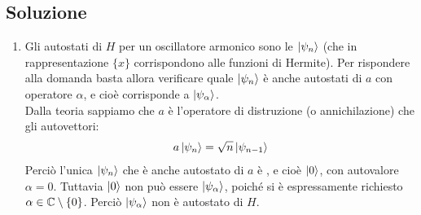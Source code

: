 \documentclass[../../FisicaTeorica.tex]{subfiles}
\begin{document}
\subsection{Soluzione}
\begin{enumerate}
\item Gli autostati di $H$ per un oscillatore armonico sono le $\Ket{\psi_n}$ (che in rappresentazione $\{x\}$ corrispondono alle funzioni di Hermite). Per rispondere alla domanda basta allora verificare quale $\Ket{\psi_n}$ è anche autostati di $a$ con operatore $\alpha$, e cioè corrisponde a $\Ket{\psi_\alpha}$.\\
Dalla teoria sappiamo che $a$ è l'operatore di distruzione (o annichilazione) che  gli autovettori:
\begin{align*}
a\Ket{\psi_n} = \sqrt{n}\Ket{\psi_{n-1}}
\end{align*}
Perciò l'unica $\Ket{\psi_n}$ che è anche autostato di $a$ è , e cioè $\Ket{0}$, con autovalore $\alpha = 0$. Tuttavia $\Ket{0}$ non può essere $\Ket{\psi_\alpha}$, poiché si è espressamente richiesto $\alpha \in \mathbb{C}\setminus \{0\}$. Perciò $\Ket{\psi_\alpha}$ non è autostato di $H$.


\end{enumerate}
\end{document}
